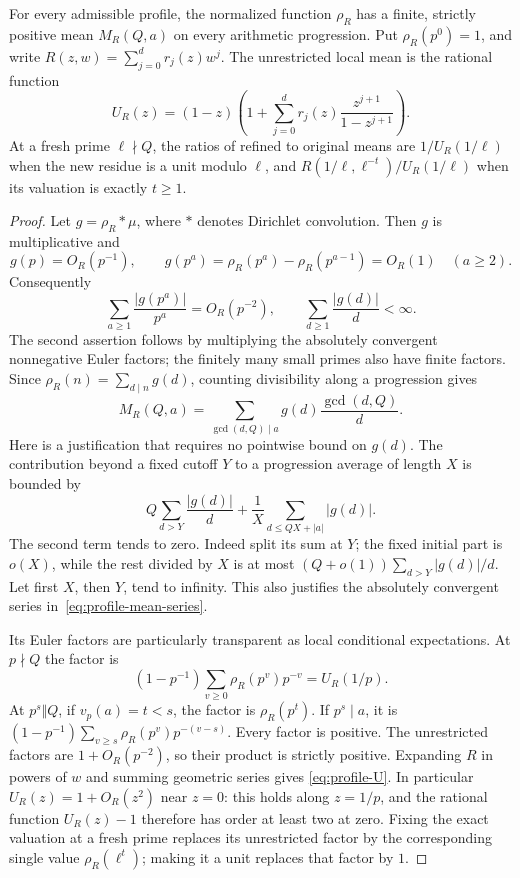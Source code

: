 \begin{lemma}
\label{lem:profile-means}
For every admissible profile, the normalized function $\rho_R$ has
a finite, strictly positive mean $M_R(Q,a)$ on every arithmetic
progression.  Put $\rho_R(p^0)=1$, and write
$R(z,w)=\sum_{j=0}^{d}r_j(z)w^j$.  The unrestricted local mean is
the rational function
\begin{equation}\label{eq:profile-U}
 U_R(z)=(1-z)\left(1+
           \sum_{j=0}^{d}r_j(z)\frac{z^{j+1}}{1-z^{j+1}}\right).
\end{equation}
At a fresh prime $\ell\nmid Q$, the ratios of refined to original
means are $1/U_R(1/\ell)$ when the new residue is a unit modulo
$\ell$, and $R(1/\ell,\ell^{-t})/U_R(1/\ell)$ when its valuation
is exactly $t\geq1$.
\end{lemma}
\begin{proof}
Let $g=\rho_R*\mu$, where $*$ denotes Dirichlet convolution.
Then $g$ is multiplicative and
\[
 g(p)=O_R(p^{-1}),\qquad
 g(p^a)=\rho_R(p^a)-\rho_R(p^{a-1})=O_R(1)\quad(a\geq2).
\]
Consequently
\[
 \sum_{a\geq1}\frac{|g(p^a)|}{p^a}=O_R(p^{-2}),\qquad
 \sum_{d\geq1}\frac{|g(d)|}{d}<\infty.
\]
The second assertion follows by multiplying the absolutely convergent
nonnegative Euler factors; the finitely many small primes also have
finite factors.  Since $\rho_R(n)=\sum_{d\mid n}g(d)$, counting
divisibility along a progression gives
\begin{equation}\label{eq:profile-mean-series}
 M_R(Q,a)=\sum_{\gcd(d,Q)\mid a}g(d)\frac{\gcd(d,Q)}{d}.
\end{equation}
Here is a justification that requires no pointwise bound on $g(d)$.
The contribution beyond a fixed cutoff $Y$ to a progression average
of length $X$ is bounded by
\[
 Q\sum_{d>Y}\frac{|g(d)|}{d}
       +\frac1X\sum_{d\leq QX+|a|}|g(d)|.
\]
The second term tends to zero.  Indeed split its sum at $Y$; the
fixed initial part is $o(X)$, while the rest divided by $X$ is at
most $(Q+o(1))\sum_{d>Y}|g(d)|/d$.  Let first $X$, then $Y$, tend
to infinity.  This also justifies the absolutely convergent series
in~\eqref{eq:profile-mean-series}.

Its Euler factors are particularly transparent as local conditional
expectations.  At $p\nmid Q$ the factor is
\[
 (1-p^{-1})\sum_{v\geq0}\rho_R(p^v)p^{-v}=U_R(1/p).
\]
At $p^s\Vert Q$, if $v_p(a)=t<s$, the factor is
$\rho_R(p^t)$.  If $p^s\mid a$, it is
$(1-p^{-1})\sum_{v\geq s}\rho_R(p^v)p^{-(v-s)}$.
Every factor is positive.  The unrestricted factors are
$1+O_R(p^{-2})$, so their product is strictly positive.
Expanding $R$ in powers of $w$ and summing geometric series gives
\eqref{eq:profile-U}.  In particular $U_R(z)=1+O_R(z^2)$ near
$z=0$: this holds along $z=1/p$, and the rational function
$U_R(z)-1$ therefore has order at least two at zero.
Fixing the exact valuation at a fresh prime
replaces its unrestricted factor by the corresponding single value
$\rho_R(\ell^t)$; making it a unit replaces that factor by $1$.
\end{proof}

